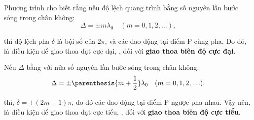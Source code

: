 Phương trình  cho biết rằng nếu độ lệch quang trình bằng số nguyên lần bước sóng trong chân không:
\begin{equation}\label{eq:17_5}
    \Delta = \pm m \lambda_0 \quad (m = 0, 1, 2, \ldots),
\end{equation}

\noindent
thì độ lệch pha $\delta$ là bội số của $2\pi$, và các dao động tại điểm P cùng pha.
Do đó,  là điều kiện để giao thoa đạt cực đại, \ie, đối với \textbf{giao thoa biên độ cực đại}.

Nếu $\Delta$ bằng với nửa số nguyên lần bước sóng trong chân không:
\begin{equation}\label{eq:17_6}
    \Delta = \pm \parenthesis{m + \frac{1}{2}} \lambda_0 \quad (m = 0, 1, 2, \ldots),
\end{equation}

\noindent
thì, $\delta=\pm(2m + 1)\pi$, do đó các dao động tại điểm P ngược pha nhau.
Vậy nên,  là điều kiện để giao thoa đạt cực tiểu, \ie, đối với \textbf{giao thoa biên độ cực tiểu}.

